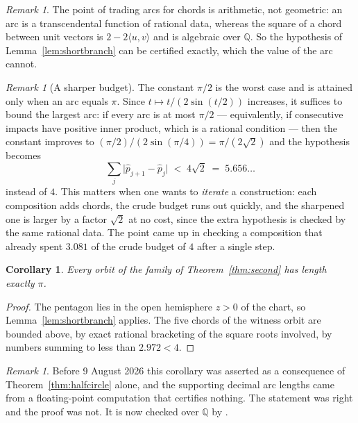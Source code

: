 \documentclass[11pt,a4paper]{article}
\theoremstyle{plain}
\newtheorem{corollary}[theorem]{Corollary}
\theoremstyle{definition}
\theoremstyle{remark}
\newtheorem{remark}[theorem]{Remark}
\begin{document}
\begin{remark}
The point of trading arcs for chords is arithmetic, not geometric: an arc is a
transcendental function of rational data, whereas the square of a chord between unit
vectors is $2-2\langle u,v\rangle$ and is algebraic over $\mathbb{Q}$. So the
hypothesis of Lemma~\ref{lem:shortbranch} can be certified exactly, which the value
of the arc cannot.
\end{remark}

\begin{remark}[A sharper budget]\label{rem:sharperbudget}
The constant $\pi/2$ is the worst case and is attained only when an arc equals $\pi$.
Since $t\mapsto t/(2\sin(t/2))$ increases, it suffices to bound the largest arc: if
every arc is at most $\pi/2$ --- equivalently, if consecutive impacts have positive
inner product, which is a rational condition --- then the constant improves to
$(\pi/2)/(2\sin(\pi/4))=\pi/(2\sqrt2)$ and the hypothesis becomes
\[
  \sum_j\bigl|\hat p_{j+1}-\hat p_j\bigr|\;<\;4\sqrt2\;=\;5.656\ldots
\]
instead of $4$. This matters when one wants to \emph{iterate} a construction: each
composition adds chords, the crude budget runs out quickly, and the sharpened one is
larger by a factor $\sqrt2$ at no cost, since the extra hypothesis is checked by the
same rational data. The point came up in checking a composition that already spent
$3.081$ of the crude budget of $4$ after a single step.
\end{remark}

\begin{corollary}\label{cor:secondlength}
Every orbit of the family of Theorem~\ref{thm:second} has length exactly $\pi$.
\end{corollary}

\begin{proof}
The pentagon lies in the open hemisphere $z>0$ of the chart, so
Lemma~\ref{lem:shortbranch} applies. The five chords of the witness orbit are bounded
above, by exact rational bracketing of the square roots involved, by numbers summing
to less than $2.972<4$.
\end{proof}

\begin{remark}
Before 9 August 2026 this corollary was asserted as a consequence of
Theorem~\ref{thm:halfcircle} alone, and the supporting decimal arc lengths came
from a floating-point computation that certifies nothing. The
statement was right and the proof was not. It is now checked over $\mathbb{Q}$ by
.
\end{remark}
\end{document}
